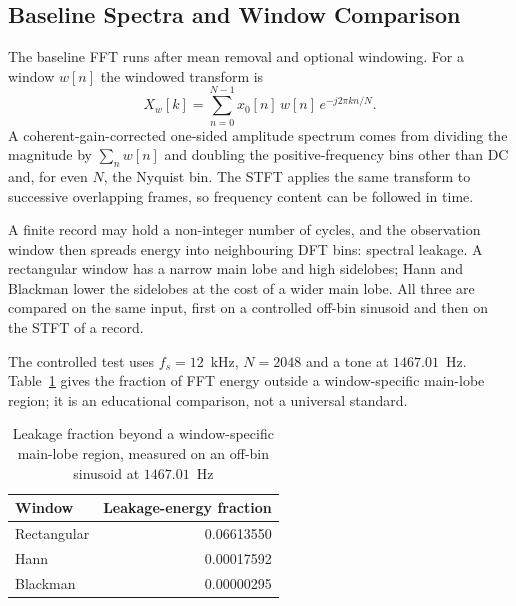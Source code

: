 \subsection{Baseline Spectra and Window Comparison}
The baseline FFT runs after mean removal and optional windowing. For a window
$w[n]$ the windowed transform is
\begin{equation}
  X_w[k] = \sum_{n=0}^{N-1} x_0[n]\,w[n]\,e^{-j2\pi kn/N}.
  \label{eq:dft}
\end{equation}
A coherent-gain-corrected one-sided amplitude spectrum comes from dividing the
magnitude by $\sum_n w[n]$ and doubling the positive-frequency bins other than
DC and, for even $N$, the Nyquist bin. The STFT applies the same transform to
successive overlapping frames, so frequency content can be followed in time.

A finite record may hold a non-integer number of cycles, and the observation
window then spreads energy into neighbouring DFT bins: spectral leakage. A
rectangular window has a narrow main lobe and high sidelobes; Hann and
Blackman lower the sidelobes at the cost of a wider main lobe. All three are
compared on the same input, first on a controlled off-bin sinusoid and then on
the STFT of a record.

The controlled test uses $f_s=12$~kHz, $N=2048$ and a tone at $1467.01$~Hz.
Table~\ref{tab:leakage} gives the fraction of FFT energy outside a
window-specific main-lobe region; it is an educational comparison, not a
universal standard.

\begin{table}[!t]
\caption{Leakage fraction beyond a window-specific main-lobe region, measured
on an off-bin sinusoid at $1467.01$~Hz}
\label{tab:leakage}
\centering
\footnotesize
\begin{tabular}{lr}
\toprule
Window & Leakage-energy fraction \\
\midrule
Rectangular & 0.06613550 \\
Hann        & 0.00017592 \\
Blackman    & 0.00000295 \\
\bottomrule
\end{tabular}
\end{table}

